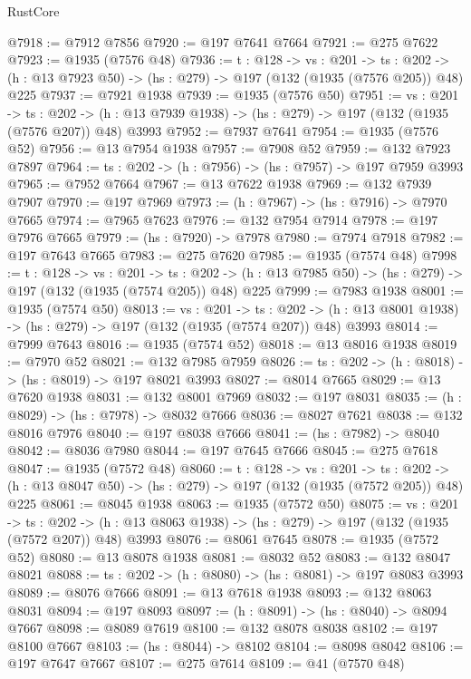\begin{lexlean}{RustCore}
\begin{coremodule}
@7918 := @7912 @7856
@7920 := @197 @7641 @7664
@7921 := @275 @7622
@7923 := @1935 (@7576 @48)
@7936 := {t : @128} ->
  {vs : @201} ->
  {ts : @202} -> (h : @13 @7923 @50) -> (hs : @279) -> @197 (@132 (@1935 (@7576 @205)) @48) @225
@7937 := @7921 @1938
@7939 := @1935 (@7576 @50)
@7951 := {vs : @201} ->
  {ts : @202} -> (h : @13 @7939 @1938) -> (hs : @279) -> @197 (@132 (@1935 (@7576 @207)) @48) @3993
@7952 := @7937 @7641
@7954 := @1935 (@7576 @52)
@7956 := @13 @7954 @1938
@7957 := @7908 @52
@7959 := @132 @7923 @7897
@7964 := {ts : @202} -> (h : @7956) -> (hs : @7957) -> @197 @7959 @3993
@7965 := @7952 @7664
@7967 := @13 @7622 @1938
@7969 := @132 @7939 @7907
@7970 := @197 @7969
@7973 := (h : @7967) -> (hs : @7916) -> @7970 @7665
@7974 := @7965 @7623
@7976 := @132 @7954 @7914
@7978 := @197 @7976 @7665
@7979 := (hs : @7920) -> @7978
@7980 := @7974 @7918
@7982 := @197 @7643 @7665
@7983 := @275 @7620
@7985 := @1935 (@7574 @48)
@7998 := {t : @128} ->
  {vs : @201} ->
  {ts : @202} -> (h : @13 @7985 @50) -> (hs : @279) -> @197 (@132 (@1935 (@7574 @205)) @48) @225
@7999 := @7983 @1938
@8001 := @1935 (@7574 @50)
@8013 := {vs : @201} ->
  {ts : @202} -> (h : @13 @8001 @1938) -> (hs : @279) -> @197 (@132 (@1935 (@7574 @207)) @48) @3993
@8014 := @7999 @7643
@8016 := @1935 (@7574 @52)
@8018 := @13 @8016 @1938
@8019 := @7970 @52
@8021 := @132 @7985 @7959
@8026 := {ts : @202} -> (h : @8018) -> (hs : @8019) -> @197 @8021 @3993
@8027 := @8014 @7665
@8029 := @13 @7620 @1938
@8031 := @132 @8001 @7969
@8032 := @197 @8031
@8035 := (h : @8029) -> (hs : @7978) -> @8032 @7666
@8036 := @8027 @7621
@8038 := @132 @8016 @7976
@8040 := @197 @8038 @7666
@8041 := (hs : @7982) -> @8040
@8042 := @8036 @7980
@8044 := @197 @7645 @7666
@8045 := @275 @7618
@8047 := @1935 (@7572 @48)
@8060 := {t : @128} ->
  {vs : @201} ->
  {ts : @202} -> (h : @13 @8047 @50) -> (hs : @279) -> @197 (@132 (@1935 (@7572 @205)) @48) @225
@8061 := @8045 @1938
@8063 := @1935 (@7572 @50)
@8075 := {vs : @201} ->
  {ts : @202} -> (h : @13 @8063 @1938) -> (hs : @279) -> @197 (@132 (@1935 (@7572 @207)) @48) @3993
@8076 := @8061 @7645
@8078 := @1935 (@7572 @52)
@8080 := @13 @8078 @1938
@8081 := @8032 @52
@8083 := @132 @8047 @8021
@8088 := {ts : @202} -> (h : @8080) -> (hs : @8081) -> @197 @8083 @3993
@8089 := @8076 @7666
@8091 := @13 @7618 @1938
@8093 := @132 @8063 @8031
@8094 := @197 @8093
@8097 := (h : @8091) -> (hs : @8040) -> @8094 @7667
@8098 := @8089 @7619
@8100 := @132 @8078 @8038
@8102 := @197 @8100 @7667
@8103 := (hs : @8044) -> @8102
@8104 := @8098 @8042
@8106 := @197 @7647 @7667
@8107 := @275 @7614
@8109 := @41 (@7570 @48)

\end{coremodule}
\end{lexlean}
